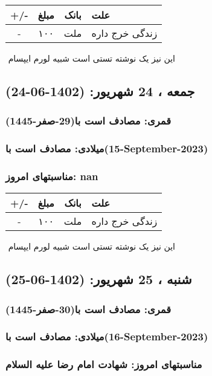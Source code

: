 \documentclass{article}
\newcommand{\rnote}[1]{\marginpar{\textcolor{color}{\StrSubstitute{\##1}{ }{\_}}}}
\newcommand{\myRow}[4]{
    #1 & #2 & #3 & #4 \\ \hline
}
\begin{document}
\begin{tabular}{ | c | c | c | p{5cm} |}
    \hline
    \myRow{ +/- }{مبلغ}{بانک}{علت}
    \myRow{-}{۱۰۰}{ملت}{زندگی خرج داره}
\end{tabular}
\newline
\newline

‌
\rnote{تست}
این نیز یک نوشته تستی است شبیه لورم ایپسام




\newpage
{}
\textcolor{color}{
\section{ جمعه ، 24 شهریور: (1402-06-24) }
\subsubsection*{قمری: مصادف است با(29-صفر-1445)} 
\subsubsection*{میلادی: مصادف است با(15-September-2023)}
\subsubsection*{مناسبتهای امروز: nan}
}


\begin{tabular}{ | c | c | c | p{5cm} |}
    \hline
    \myRow{ +/- }{مبلغ}{بانک}{علت}
    \myRow{-}{۱۰۰}{ملت}{زندگی خرج داره}
\end{tabular}
\newline
\newline

‌
\rnote{تست}
این نیز یک نوشته تستی است شبیه لورم ایپسام




\newpage
{}
\textcolor{color}{
\section{ شنبه ، 25 شهریور: (1402-06-25) }
\subsubsection*{قمری: مصادف است با(30-صفر-1445)} 
\subsubsection*{میلادی: مصادف است با(16-September-2023)}
\subsubsection*{مناسبتهای امروز: شهادت امام رضا علیه السلام}
}
\end{document}
